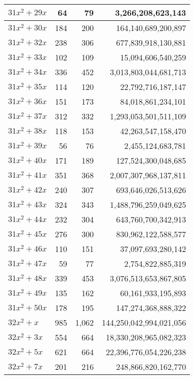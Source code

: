 \documentclass[a4paper]{amsproc}
\theoremstyle{plain}
\theoremstyle{named}
\begin{document}
\begin{longtable}{ | l | r | r | r | }
$31x^2 + 29x$ & 64 & 79 & 3{,}266{,}208{,}623{,}143 \\ \hline
$31x^2 + 30x$ & 184 & 200 & 164{,}140{,}689{,}200{,}897 \\ \hline
$31x^2 + 32x$ & 238 & 306 & 677{,}839{,}918{,}130{,}881 \\ \hline
$31x^2 + 33x$ & 102 & 109 & 15{,}094{,}606{,}540{,}259 \\ \hline
$31x^2 + 34x$ & 336 & 452 & 3{,}013{,}803{,}044{,}681{,}713 \\ \hline
$31x^2 + 35x$ & 114 & 120 & 22{,}792{,}716{,}187{,}147 \\ \hline
$31x^2 + 36x$ & 151 & 173 & 84{,}018{,}861{,}234{,}101 \\ \hline
$31x^2 + 37x$ & 312 & 332 & 1{,}293{,}053{,}501{,}511{,}109 \\ \hline
$31x^2 + 38x$ & 118 & 153 & 42{,}263{,}547{,}158{,}470 \\ \hline
$31x^2 + 39x$ & 56 & 76 & 2{,}455{,}124{,}683{,}781 \\ \hline
$31x^2 + 40x$ & 171 & 189 & 127{,}524{,}300{,}048{,}685 \\ \hline
$31x^2 + 41x$ & 351 & 368 & 2{,}007{,}307{,}968{,}137{,}811 \\ \hline
$31x^2 + 42x$ & 240 & 307 & 693{,}646{,}026{,}513{,}626 \\ \hline
$31x^2 + 43x$ & 324 & 343 & 1{,}488{,}796{,}259{,}049{,}625 \\ \hline
$31x^2 + 44x$ & 232 & 304 & 643{,}760{,}700{,}342{,}913 \\ \hline
$31x^2 + 45x$ & 276 & 300 & 830{,}962{,}122{,}588{,}577 \\ \hline
$31x^2 + 46x$ & 110 & 151 & 37{,}097{,}693{,}280{,}142 \\ \hline
$31x^2 + 47x$ & 59 & 77 & 2{,}754{,}822{,}885{,}319 \\ \hline
$31x^2 + 48x$ & 339 & 453 & 3{,}076{,}513{,}653{,}867{,}805 \\ \hline
$31x^2 + 49x$ & 135 & 162 & 60{,}161{,}933{,}195{,}893 \\ \hline
$31x^2 + 50x$ & 178 & 195 & 147{,}274{,}368{,}888{,}322 \\ \hline
$32x^2 + x$ & 985 & 1{,}062 & 144{,}250{,}042{,}994{,}021{,}056 \\ \hline
$32x^2 + 3x$ & 554 & 664 & 18{,}330{,}208{,}965{,}082{,}323 \\ \hline
$32x^2 + 5x$ & 621 & 664 & 22{,}396{,}776{,}054{,}226{,}238 \\ \hline
$32x^2 + 7x$ & 201 & 216 & 248{,}866{,}820{,}162{,}770 \\ \hline

\end{longtable}
\end{document}
